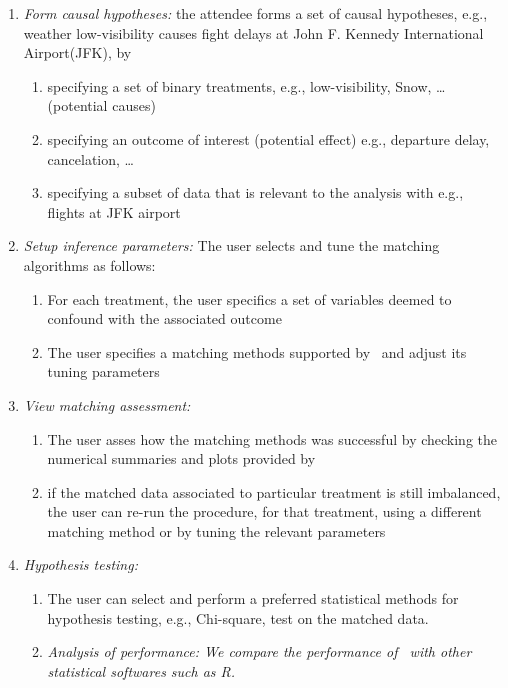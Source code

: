 \begin{enumerate}
  \item {\it Form causal hypotheses:} the attendee forms a set of causal hypotheses, e.g.,
   weather low-visibility causes fight delays at John F. Kennedy International Airport(JFK), by
    \begin{enumerate}
      \item specifying a set of binary treatments, e.g., low-visibility, Snow, \ldots (potential causes)
      \item specifying an outcome of interest (potential effect) e.g., departure delay, cancelation, \ldots
      \item specifying a subset of data that is relevant to the analysis with e.g., flights at JFK airport
    \end{enumerate}

  \item {\it Setup inference parameters:} The user selects and tune the matching algorithms as follows:
     \begin{enumerate}
      \item For each treatment, the user specifics a set of variables deemed to confound with the associated outcome
      \item The user specifies a matching methods supported by \GSQL\ and adjust its tuning parameters
\end{enumerate}

  \item {\it View matching assessment:}
    \begin{enumerate}
      \item The user asses how the matching methods was successful by checking the numerical summaries and plots provided by \GSQL
      \item
      if the matched data associated to  particular treatment is still imbalanced, the user can re-run the procedure, for that treatment,
        using a different matching method or by tuning the relevant parameters
    \end{enumerate}
  \item {\it Hypothesis testing:}
    \begin{enumerate}
      \item The user can select and perform a preferred statistical methods for hypothesis testing, e.g., Chi-square, test on the matched data.
    \item {\it Analysis of performance: We compare the performance of \GSQL\ with other statistical softwares such as R.}
   
    \end{enumerate}
\end{enumerate}



